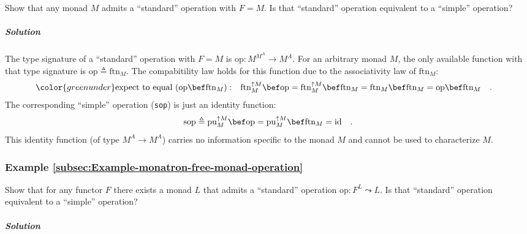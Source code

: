 Show that any monad $M$ admits a \textsf{``}standard\textsf{''} operation with $F=M$.
Is that \textsf{``}standard\textsf{''} operation equivalent to a \textsf{``}simple\textsf{''} operation?

\subparagraph{Solution}

The type signature of a \textsf{``}standard\textsf{''} operation with $F=M$ is $\text{op}:M^{M^{A}}\rightarrow M^{A}$.
For an arbitrary monad $M$, the only available function with that
type signature is $\text{op}\triangleq\text{ftn}_{M}$. The compabitility
law holds for this function due to the associativity law of $\text{ftn}_{M}$:
\begin{align*}
{\color{greenunder}\text{expect to equal }(\text{op}\bef\text{ftn}_{M}):}\quad & \text{ftn}_{M}^{\uparrow M}\bef\text{op}=\text{ftn}_{M}^{\uparrow M}\bef\text{ftn}_{M}=\text{ftn}_{M}\bef\text{ftn}_{M}=\text{op}\bef\text{ftn}_{M}\quad.
\end{align*}
The corresponding \textsf{``}simple\textsf{''} operation (\lstinline!sop!) is just
an identity function:
\[
\text{sop}\triangleq\text{pu}_{M}^{\uparrow M}\bef\text{op}=\text{pu}_{M}^{\uparrow M}\bef\text{ftn}_{M}=\text{id}\quad.
\]
This identity function (of type $M^{A}\rightarrow M^{A}$) carries
no information specific to the monad $M$ and cannot be used to characterize
$M$.

\subsubsection{Example \label{subsec:Example-monatron-free-monad-operation}\ref{subsec:Example-monatron-free-monad-operation}}

Show that for any functor $F$ there exists a monad $L$ that admits
a \textsf{``}standard\textsf{''} operation $\text{op}:F^{L}\leadsto L$. Is that \textsf{``}standard\textsf{''}
operation equivalent to a \textsf{``}simple\textsf{''} operation?

\subparagraph{Solution}

